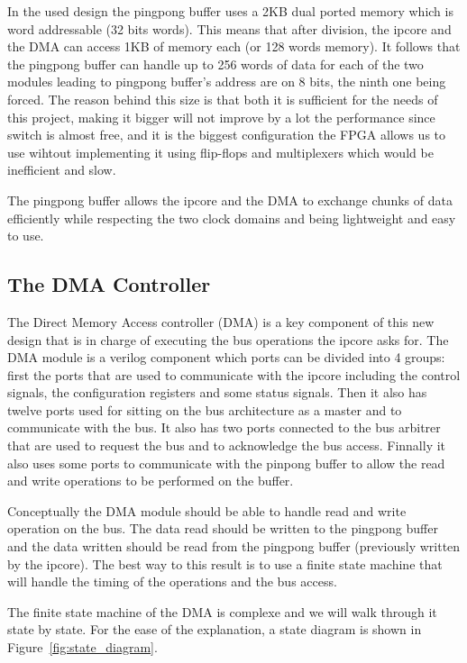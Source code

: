 \documentclass[a4paper,11pt,oneside]{report}
\begin{document}
In the used design the pingpong buffer uses a 2KB dual ported memory which is word addressable (32 bits words).
This means that after division, the ipcore and the DMA can access 1KB of memory each (or 128 words memory).
It follows that the pingpong buffer can handle up to 256 words of data for each of the two modules leading to pingpong buffer's address are on 8 bits, the ninth one being forced.
The reason behind this size is that both it is sufficient for the needs of this project, making it bigger will not improve by a lot the performance since switch is almost free, and 
 it is the biggest configuration the FPGA allows us to use wihtout implementing it using flip-flops and multiplexers which would be inefficient and slow. 

The pingpong buffer allows the ipcore and the DMA to exchange chunks of data efficiently while respecting the two clock domains and being lightweight and easy to use.

\subsection{The DMA Controller}

The Direct Memory Access controller (DMA) is a key component of this new design that is in charge of executing the bus operations the ipcore asks for.
The DMA module is a verilog component which ports can be divided into 4 groups: first the ports that are used to communicate with the ipcore including the control signals,
the configuration registers and some status signals. 
Then it also has twelve ports used for sitting on the bus architecture as a master and to communicate with the bus.
It also has two ports connected to the bus arbitrer that are used to request the bus and to acknowledge the bus access.
Finnally it also uses some ports to communicate with the pinpong buffer to allow the read and write operations to be performed on the buffer.

Conceptually the DMA module should be able to handle read and write operation on the bus. The data read should be written to the pingpong buffer and
the data written should be read from the pingpong buffer (previously written by the ipcore).
The best way to this result is to use a finite state machine that will handle the timing of the operations and the bus access.

The finite state machine of the DMA is complexe and we will walk through it state by state.
For the ease of the explanation, a state diagram is shown in Figure~\ref{fig:state_diagram}.
\end{document}
